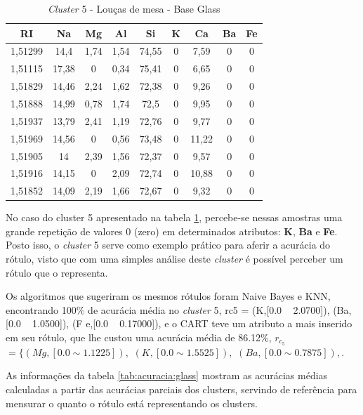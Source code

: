 \begin{table}[!h]
\centering
\caption{\textit{Cluster} 5 - Louças de mesa - Base Glass }
\label{tab:glass:cluster5}
\begin{tabular}{c|c|c|c|c|c|c|c|c}
\hline
\rowcolor[HTML]{EFEFEF}
\textbf{RI} & \textbf{Na} & \textbf{Mg} & \textbf{Al} & \textbf{Si} & \textbf{K} & \textbf{Ca} & \textbf{Ba} & \textbf{Fe}\\ \hline 
1,51299 & 14,4 & 1,74 & 1,54 & 74,55 & 0 & 7,59 & 0 & 0\\ 
1,51115 & 17,38 & 0 & 0,34 & 75,41 & 0 & 6,65 & 0 & 0\\ 
1,51829 & 14,46 & 2,24 & 1,62 & 72,38 & 0 & 9,26 & 0 & 0\\ 
1,51888 & 14,99 & 0,78 & 1,74 & 72,5 & 0 & 9,95 & 0 & 0\\ 
1,51937 & 13,79 & 2,41 & 1,19 & 72,76 & 0 & 9,77 & 0 & 0\\ 
1,51969 & 14,56 & 0 & 0,56 & 73,48 & 0 & 11,22 & 0 & 0\\ 
1,51905 & 14 & 2,39 & 1,56 & 72,37 & 0 & 9,57 & 0 & 0\\ 
1,51916 & 14,15 & 0 & 2,09 & 72,74 & 0 & 10,88 & 0 & 0\\ 
1,51852 & 14,09 & 2,19 & 1,66 & 72,67 & 0 & 9,32 & 0 & 0\\ 

    
\end{tabular}
\end{table}

No caso do cluster 5 apresentado na tabela \ref{tab:glass:cluster5}, percebe-se nessas amostras uma grande repetição de valores 0 (zero) em determinados atributos:  \textbf{K}, \textbf{Ba} e \textbf{Fe}. Posto isso, o \textit{cluster} 5 serve como exemplo prático para aferir a acurácia do rótulo, visto que com uma simples análise deste \textit{cluster} é possível perceber um rótulo que o representa. 
 

Os algoritmos que sugeriram os mesmos rótulos foram Naive Bayes e KNN, encontrando 100\% de acurácia média no \textit{cluster} 5, rc5 = {(K,[0.0 ~ 2.0700]), (Ba,[0.0 ~ 1.0500]), (F e,[0.0 ~ 0.17000])}, e o CART teve um atributo a mais inserido em seu rótulo, que lhe custou uma acurácia média de 86.12\%, ${r_{c_5}}$ ${=\{ (Mg,[ 0.0 \sim  1.1225 ] ),}$ ${(K,[ 0.0 \sim 1.5525 ]  ),}$ ${(Ba,[ 0.0 \sim 0.7875 ] ), }$.


As informações da tabela \ref{tab:acuracia:glass} mostram as acurácias médias calculadas a partir das acurácias parciais dos clusters, servindo de referência para mensurar o quanto o rótulo está representando os clusters. 

